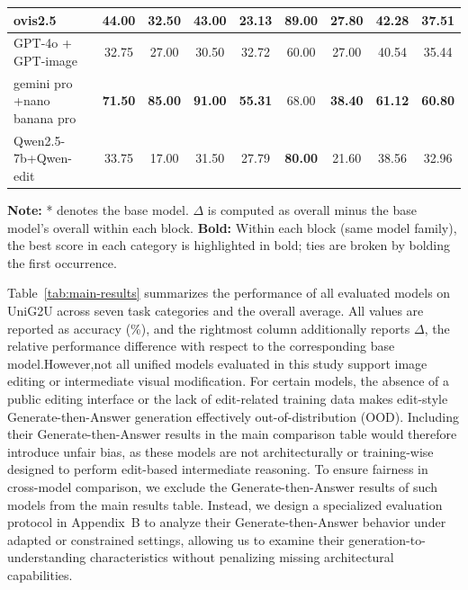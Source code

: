 \documentclass{article}
\theoremstyle{plain}
\theoremstyle{definition}
\theoremstyle{remark}
\begin{document}
\begin{table}[t]
{\begin{tabular}{@{}lcccccccc@{}}
ovis2.5 & 44.00 & \textbf{32.50} & \textbf{43.00} & 23.13 & \textbf{89.00} & 27.80 & 42.28 & 37.51 \\
\midrule
GPT-4o + GPT-image & 32.75 & 27.00 & 30.50 & 32.72 & 60.00 & 27.00 & 40.54 & 35.44 \\
gemini pro +nano banana pro & \textbf{71.50} & \textbf{85.00} & \textbf{91.00} & \textbf{55.31} & 68.00 & \textbf{38.40} & \textbf{61.12} & \textbf{60.80} \\
Qwen2.5-7b+Qwen-edit & 33.75 & 17.00 & 31.50 & 27.79 & \textbf{80.00} & 21.60 & 38.56 & 32.96 \\
\bottomrule
\end{tabular}%
}

\vspace{2pt}

{\scriptsize \textbf{Note:} * denotes the base model. $\Delta$ is computed as overall minus the base model's overall within each block.}
{\scriptsize \textbf{Bold:} Within each block (same model family), the best score in each category is highlighted in bold; ties are broken by bolding the first occurrence.}
\end{table}
Table~\ref{tab:main-results} summarizes the performance of all evaluated models on UniG2U across seven task categories and the overall average.
All values are reported as accuracy (\%), and the rightmost column additionally reports $\Delta$, the relative performance difference with respect to the corresponding base model.However,not all unified models evaluated in this study support image editing or intermediate visual modification.
For certain models, the absence of a public editing interface or the lack of edit-related training data makes edit-style Generate-then-Answer generation effectively out-of-distribution (OOD).
Including their Generate-then-Answer results in the main comparison table would therefore introduce unfair bias, as these models are not architecturally or training-wise designed to perform edit-based intermediate reasoning.
To ensure fairness in cross-model comparison, we exclude the Generate-then-Answer results of such models from the main results table.
Instead, we design a specialized evaluation protocol in Appendix~B to analyze their Generate-then-Answer behavior under adapted or constrained settings, allowing us to examine their generation-to-understanding characteristics without penalizing missing architectural capabilities.
\end{document}
